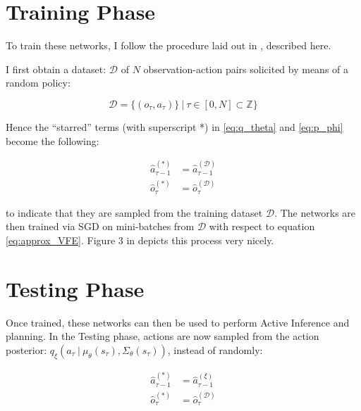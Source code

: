 \documentclass{article}
\begin{document}
\section{Training Phase}
\label{sec:training_phase}
To train these networks, I follow the procedure laid out in \cite{learn_gen_ssm_aif}, described here.

I first obtain a dataset: $\mathcal{D}$ of $N$ observation-action pairs solicited by means of a random policy:

\begin{equation}
    \label{eq:data_D}
    \mathcal{D} = \{(o_{\tau}, a_{\tau})\} \ | \ \tau \in [0, N] \subset \mathbb{Z} \}
\end{equation}

Hence the ``starred'' terms (with superscript *) in \ref{eq:q_theta} and \ref{eq:p_phi} become the following:

\begin{equation}
    \begin{aligned}
        \label{eq:training_notation}
        \hat{a}_{\tau - 1}^{(*)} &= \hat{a}_{\tau - 1}^{(\mathcal{D})} \\
        \hat{o}_{\tau}^{(*)} &= \hat{o}_{\tau}^{(\mathcal{D})}
    \end{aligned}
\end{equation}

to indicate that they are sampled from the training dataset $\mathcal{D}$. The networks are then trained via SGD on mini-batches from $\mathcal{D}$ with respect to equation \ref{eq:approx_VFE}. Figure $3$ in \cite{learn_gen_ssm_aif} depicts this process very nicely. 

\section{Testing Phase}
\label{sec:testing_phase}
Once trained, these networks can then be used to perform Active Inference and planning. In the Testing phase, actions are now sampled from the action posterior: $q_{\xi}(a_{\tau} \ | \ \mu_{\theta}(s_{\tau}), \Sigma_{\theta}(s_{\tau}))$, instead of randomly:

\begin{equation}
    \begin{aligned}
        \label{eq:testing_notation}
        \hat{a}_{\tau - 1}^{(*)} &= \hat{a}_{\tau - 1}^{(\xi)} \\
        \hat{o}_{\tau}^{(*)} &= \hat{o}_{\tau}^{(\mathcal{D})}
    \end{aligned}
\end{equation}
\end{document}

